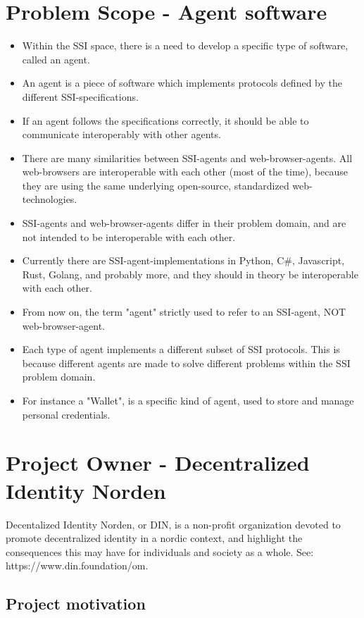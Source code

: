 \section{Problem Scope - Agent software} 
\begin{itemize}
    \item Within the SSI space, there is a need to develop a specific type of software, called an agent.
    \item An agent is a piece of software which implements protocols defined by the different SSI-specifications.
    \item If an agent follows the specifications correctly, it should be able to communicate interoperably with other agents.
    \item There are many similarities between SSI-agents and web-browser-agents. All web-browsers are interoperable with each other (most of the time), because they are using the same underlying open-source, standardized web-technologies.
    \item SSI-agents and web-browser-agents differ in their problem domain, and are not intended to be interoperable with each other.
    \item Currently there are SSI-agent-implementations in Python, C#, Javascript, Rust, Golang, and probably more, and they should in theory be interoperable with each other. 
    \item From now on, the term "agent" strictly used to refer to an SSI-agent, NOT web-browser-agent.
    \item Each type of agent implements a different subset of SSI protocols. This is because different agents are made to solve different problems within the SSI problem domain.
    \item For instance a "Wallet", is a specific kind of agent, used to store and manage personal credentials.
\end{itemize}



\section{Project Owner - Decentralized Identity Norden}

Decentalized Identity Norden, or DIN, is a non-profit organization devoted to promote decentralized identity in a nordic context, and highlight the consequences this may have for individuals and society as a whole. See: https://www.din.foundation/om. 

\subsection{Project motivation}

